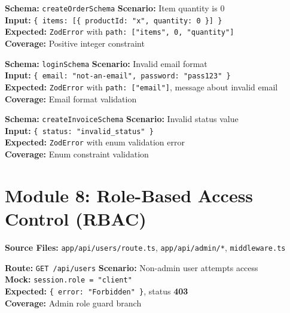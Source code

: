 \documentclass[12pt,a4paper]{report}
\newcommand{\pone}{\textbf{\color{p1red}P1}}
\newcommand{\ptwo}{\textbf{\color{p2orange}P2}}
\newcommand{\pthree}{\textbf{\color{p3blue}P3}}
\begin{document}
\begin{tcolorbox}[testbox,title={ZOD-004 \hfill \ptwo}]
\textbf{Schema:} \texttt{createOrderSchema} \quad \textbf{Scenario:} Item quantity is 0 \\
\textbf{Input:} \texttt{\{ items: [\{ productId: "x", quantity: 0 \}] \}} \\
\textbf{Expected:} \texttt{ZodError} with \texttt{path: ["items", 0, "quantity"]} \\
\textbf{Coverage:} Positive integer constraint
\end{tcolorbox}

\begin{tcolorbox}[testbox,title={ZOD-005 \hfill \pthree}]
\textbf{Schema:} \texttt{loginSchema} \quad \textbf{Scenario:} Invalid email format \\
\textbf{Input:} \texttt{\{ email: "not-an-email", password: "pass123" \}} \\
\textbf{Expected:} \texttt{ZodError} with \texttt{path: ["email"]}, message about invalid email \\
\textbf{Coverage:} Email format validation
\end{tcolorbox}

\begin{tcolorbox}[testbox,title={ZOD-006 \hfill \pthree}]
\textbf{Schema:} \texttt{createInvoiceSchema} \quad \textbf{Scenario:} Invalid status value \\
\textbf{Input:} \texttt{\{ status: "invalid\_status" \}} \\
\textbf{Expected:} \texttt{ZodError} with enum validation error \\
\textbf{Coverage:} Enum constraint validation
\end{tcolorbox}

\section{Module 8: Role-Based Access Control (RBAC)}

\textbf{Source Files:} \texttt{app/api/users/route.ts}, \texttt{app/api/admin/*}, \texttt{middleware.ts}

\begin{tcolorbox}[criticalbox,title={RBAC-001 \hfill \pone\ --- Admin-Only Endpoint}]
\textbf{Route:} \texttt{GET /api/users} \quad \textbf{Scenario:} Non-admin user attempts access \\
\textbf{Mock:} \texttt{session.role = "client"} \\
\textbf{Expected:} \texttt{\{ error: "Forbidden" \}}, status \textbf{403} \\
\textbf{Coverage:} Admin role guard branch
\end{tcolorbox}
\end{document}
